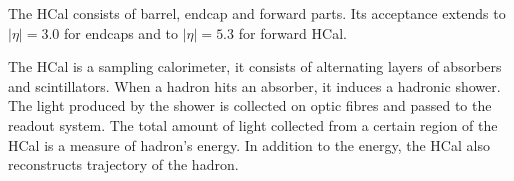 The HCal consists of barrel, endcap and forward parts. Its acceptance extends to $|\eta|=3.0$ for endcaps and to $|\eta|=5.3$ for forward HCal.

The HCal is a sampling calorimeter, it consists of alternating layers of absorbers and scintillators. When a hadron hits an absorber, it induces a hadronic shower. The light produced by the shower is collected on optic fibres and passed to the readout system. The total amount of light collected from a certain region of the HCal is a measure of hadron's energy. In addition to the energy, the HCal also reconstructs trajectory of the hadron.   





